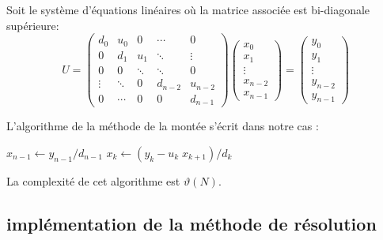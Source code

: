 \documentclass{article}
\begin{document}
Soit le système d'équations linéaires où la matrice associée est bi-diagonale supérieure:
\begin{equation}
U = \begin{pmatrix}
    d_0 & u_0 & 0 & \cdots & 0 \\
    0  & d_1 & u_1 & \ddots & \vdots \\
    0 & 0 &  \ddots & \ddots & 0 \\
    \vdots & \ddots & 0  &d_{n-2} & u_{n-2} \\
    0 & \cdots & 0 & 0 & d_{n-1}
\end{pmatrix}
\begin{pmatrix}
   x_0 \\
   x_1 \\
    \vdots\\
    x_{n-2} \\
    x_{n-1}
\end{pmatrix}
=
\begin{pmatrix}
   y_0 \\
   y_1 \\
    \vdots\\
    y_{n-2} \\
    y_{n-1}
\end{pmatrix}
\end{equation}

L'algorithme de la méthode de la montée s'écrit dans notre cas :
\begin{algorithmic}[1]
\State $x_{n-1} \gets y_{n-1}/d_{n-1}$
 \State $x_k \gets (y_k-u_k \; x_{k+1}) / d_k$
\EndFor                 
\EndFunction
\end{algorithmic}

La complexité de cet algorithme est $\vartheta(N)$.

%
 
\subsection{implémentation de la méthode de résolution}
  
\end{document}
